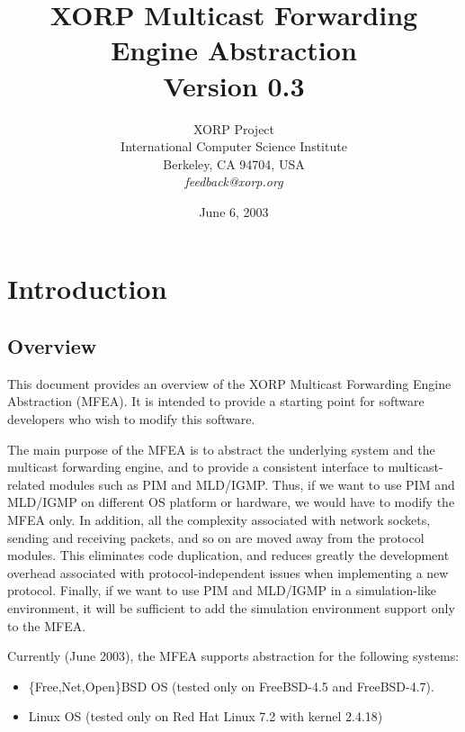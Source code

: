 \documentclass[11pt]{article}
\begin{document}
\title{XORP Multicast Forwarding Engine Abstraction \\
\vspace{1ex}
Version 0.3}
\author{ XORP Project					\\
	 International Computer Science Institute	\\
	 Berkeley, CA 94704, USA			\\
	 {\it feedback@xorp.org}
}
\date{June 6, 2003}

\maketitle

\thispagestyle{empty}


\section{Introduction}


\subsection{Overview}

This document provides an overview of the XORP Multicast Forwarding
Engine Abstraction (MFEA). It is intended to provide a starting point
for software developers who wish to modify this software.

The main purpose of the MFEA is to abstract the underlying system and
the multicast forwarding engine, and to provide a consistent interface
to multicast-related modules such as PIM and MLD/IGMP. Thus, if we want
to use PIM and MLD/IGMP on different OS platform or hardware, we
would have to modify the MFEA only. In addition, all the
complexity associated with network sockets, sending and receiving
packets, and so on are moved away from the protocol modules.
This eliminates code duplication, and reduces greatly the
development overhead associated with protocol-independent
issues when implementing a new protocol. Finally, if we want to use
PIM and MLD/IGMP in a simulation-like environment, it will be sufficient
to add the simulation environment support only to the MFEA.

Currently (June 2003), the MFEA supports abstraction for
the following systems:

\begin{itemize}
  \item \{Free,Net,Open\}BSD OS (tested only on FreeBSD-4.5 and FreeBSD-4.7).
  \item Linux OS (tested only on Red Hat Linux 7.2 with kernel 2.4.18)
\end{itemize}
\end{document}
